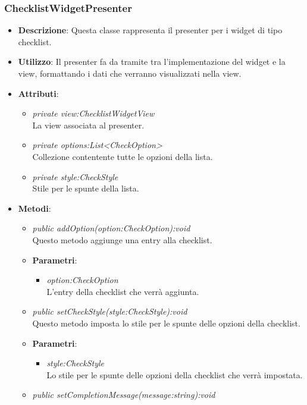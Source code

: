 \subsubsection{ChecklistWidgetPresenter}
\begin{itemize}
\item \textbf{Descrizione}: Questa classe rappresenta il presenter per i widget di tipo checklist.
\item \textbf{Utilizzo}: Il presenter fa da tramite tra l'implementazione del widget e la view, formattando i dati che verranno visualizzati nella view.
\item \textbf{Attributi}:
	\begin{itemize}
	\item \textit{private view:ChecklistWidgetView}\\
	La view associata al presenter.
	\item \textit{private options:List<CheckOption>}\\
	Collezione contentente tutte le opzioni della lista.
	\item \textit{private style:CheckStyle}\\
	Stile per le spunte della lista.
	\end{itemize}
\item \textbf{Metodi}:
	\begin{itemize}
	\item \textit{public addOption(option:CheckOption):void}\\
	Questo metodo aggiunge una entry alla checklist.
		\item{\textbf{Parametri}: \begin{itemize}
		\item \textit{option:CheckOption}\\
		L'entry della checklist che verrà aggiunta.
		\end{itemize}}
	\item \textit{public setCheckStyle(style:CheckStyle):void}\\
	Questo metodo imposta lo stile per le spunte delle opzioni della checklist.
		\item{\textbf{Parametri}: \begin{itemize}
		\item \textit{style:CheckStyle}\\
		Lo stile per le spunte delle opzioni della checklist che verrà impostata.
		\end{itemize}} 
	\item \textit{public setCompletionMessage(message:string):void}\\

\end{itemize}
\end{itemize}
